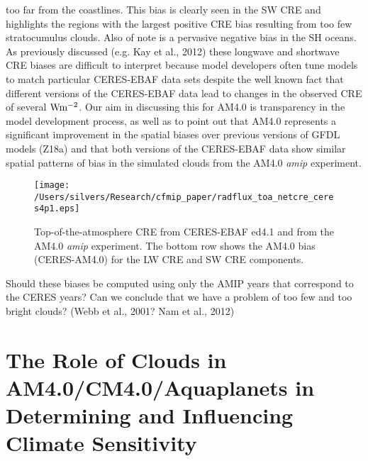 \documentclass[draft]{agujournal2019}
\begin{document}
too far from the coastlines. 
This bias is clearly seen in the SW CRE and highlights the regions with the largest
positive CRE bias resulting from too few stratocumulus clouds.  Also of note is a pervasive negative bias in the SH oceans.   
  As previously discussed (e.g. Kay et al., 2012) these longwave and shortwave CRE 
biases are difficult to interpret because model developers often tune models to match particular CERES-EBAF data 
sets despite the well known fact that different versions of the CERES-EBAF data lead to changes in the observed CRE of
several $\rm{W m^{-2}}$.   Our aim in discussing this for AM4.0 is transparency in the model development process, 
as well as to point out that AM4.0 represents a significant improvement in the spatial biases over previous versions
of GFDL models (Z18a) and that both versions of the CERES-EBAF data show similar spatial patterns of bias in the 
simulated clouds  from the AM4.0 \textit{amip} experiment.   

\begin{figure}
  \centering
  \texttt{[image: /Users/silvers/Research/cfmip\_paper/radflux\_toa\_netcre\_ceres4p1.eps]}
  \caption{Top-of-the-atmosphere CRE from CERES-EBAF ed4.1 and from the AM4.0 \textit{amip} experiment.  
  The bottom row shows the AM4.0 bias (CERES-AM4.0) for the LW CRE and SW CRE components.}
  \label{fig:ceres_cre_4p1}
\end{figure}

Should these biases be computed using only the AMIP years that 
correspond to the CERES years? 
Can we conclude that we have a problem of too few and too bright clouds?   (Webb et al., 2001? Nam et al., 2012)



\section{The Role of Clouds in AM4.0/CM4.0/Aquaplanets in Determining and Influencing Climate Sensitivity}

\end{document}
